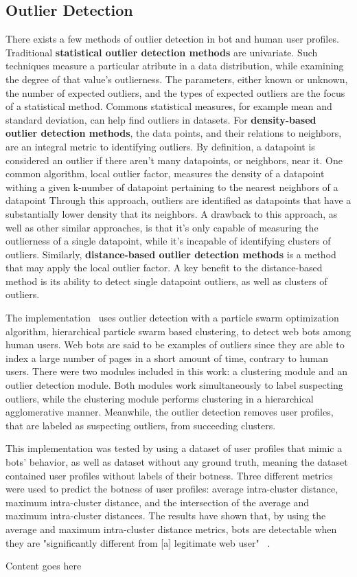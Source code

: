 \subsection{Outlier Detection}\label{subsec:outlier-detection}
There exists a few methods of outlier detection in bot and human user profiles.
Traditional \textbf{statistical outlier detection methods} are univariate.
Such techniques measure a particular atribute in a data distribution, while examining the degree of that value's outlierness.
The parameters, either known or unknown, the number of expected outliers, and the types of expected outliers are the focus of a statistical method.
Commons statistical measures, for example mean and standard deviation, can help find outliers in datasets.
For \textbf{density-based outlier detection methods}, the data points, and their relations to neighbors, are an integral metric to identifying outliers.
By definition, a datapoint is considered an outlier if there aren't many datapoints, or neighbors, near it.
One common algorithm, local outlier factor, measures the density of a datapoint withing a given k-number of datapoint pertaining to the nearest neighbors of a datapoint
Through this approach, outliers are identified as datapoints that have a substantially lower density that its neighbors.
A drawback to this approach, as well as other similar approaches, is that it's only capable of measuring the outlierness of a single datapoint, while it's incapable of identifying clusters of outliers.
Similarly, \textbf{distance-based outlier detection methods} is a method that may apply the local outlier factor.
A key benefit to the distance-based method is its ability to detect single datapoint outliers, as well as clusters of outliers.

The implementation~\cite{particle_swarm} uses outlier detection with a particle swarm optimization algorithm, hierarchical particle swarm based clustering, to detect web bots among human users.
Web bots are said to be examples of outliers since they are able to index a large number of pages in a short amount of time, contrary to human users.
There were two modules included in this work: a clustering module and an outlier detection module.
Both modules work simultaneously to label suspecting outliers, while the clustering module performs clustering in a hierarchical agglomerative manner.
Meanwhile, the outlier detection removes user profiles, that are labeled as suspecting outliers, from succeeding clusters.

This implementation was tested by using a dataset of user profiles that mimic a bots' behavior, as well as dataset without any ground truth, meaning the dataset contained user profiles without labels of their botness.
Three different metrics were used to predict the botness of user profiles: average intra-cluster distance, maximum intra-cluster distance, and the intersection of the average and maximum intra-cluster distances.
The results have shown that, by using the average and maximum intra-cluster distance metrics, bots are detectable when they are "significantly different from [a] legitimate web user" ~\cite{particle_swarm}.

Content goes here~\cite{optimized_outlier_bot_detection}
